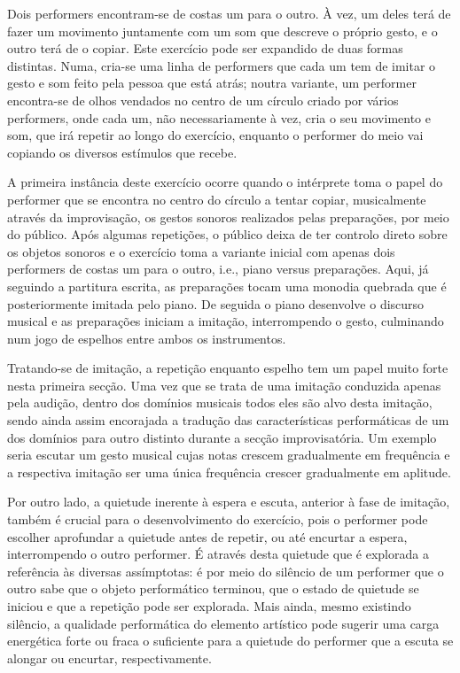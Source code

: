 \documentclass[../main.tex]{subfiles}
\begin{document}

\begin{performex}
    Dois performers encontram-se de costas um para o outro. À vez, um deles terá de fazer um movimento juntamente com um som que descreve o próprio gesto, e o outro terá de o copiar. Este exercício pode ser expandido de duas formas distintas. Numa, cria-se uma linha de performers que cada um tem de imitar o gesto e som feito pela pessoa que está atrás; noutra variante, um performer encontra-se de olhos vendados no centro de um círculo criado por vários performers, onde cada um, não necessariamente à vez, cria o seu movimento e som, que irá repetir ao longo do exercício, enquanto o performer do meio vai copiando os diversos estímulos que recebe.
\end{performex}

A primeira instância deste exercício ocorre quando o intérprete toma o papel do performer que se encontra no centro do círculo a tentar copiar, musicalmente através da improvisação, os gestos sonoros realizados pelas preparações, por meio do público. Após algumas repetições, o público deixa de ter controlo direto sobre os objetos sonoros e o exercício toma a variante inicial com apenas dois performers de costas um para o outro, i.e., piano versus preparações. Aqui, já seguindo a partitura escrita, as preparações tocam uma monodia quebrada que é posteriormente imitada pelo piano. De seguida o piano desenvolve o discurso musical e as preparações iniciam a imitação, interrompendo o gesto, culminando num jogo de espelhos entre ambos os instrumentos.

Tratando-se de imitação, a repetição enquanto espelho tem um papel muito forte nesta primeira secção. Uma vez que se trata de uma imitação conduzida apenas pela audição, dentro dos domínios musicais todos eles são alvo desta imitação, sendo ainda assim encorajada a tradução das características performáticas de um dos domínios para outro distinto durante a secção improvisatória. Um exemplo seria escutar um gesto musical cujas notas crescem gradualmente em frequência e a respectiva imitação ser uma única frequência crescer gradualmente em aplitude.

Por outro lado, a quietude inerente à espera e escuta, anterior à fase de imitação, também é crucial para o desenvolvimento do exercício, pois o performer pode escolher aprofundar a quietude antes de repetir, ou até encurtar a espera, interrompendo o outro performer. É através desta quietude que é explorada a referência às diversas assímptotas: é por meio do silêncio de um performer que o outro sabe que o objeto performático terminou, que o estado de quietude se iniciou e que a repetição pode ser explorada. Mais ainda, mesmo existindo silêncio, a qualidade performática do elemento artístico pode sugerir uma carga energética forte ou fraca o suficiente para a quietude do performer que a escuta se alongar ou encurtar, respectivamente.
\end{document}
